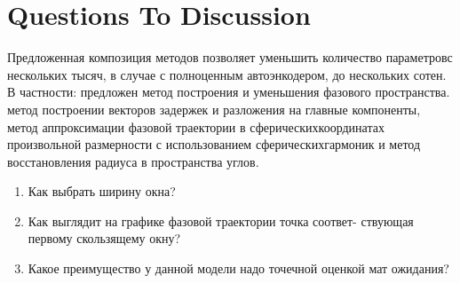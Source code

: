 \section{Questions To Discussion}

Предложенная композиция методов позволяет уменьшить количество параметровс нескольких тысяч, в случае с полноценным автоэнкодером, до нескольких сотен.
В частности: предложен метод построения и уменьшения фазового пространства. метод построении векторов задержек и разложения на главные компоненты, метод аппроксимации фазовой траектории в сферическихкоординатах произвольной размерности с использованием сферическихгармоник и метод восстановления радиуса в пространства углов.
\begin{enumerate}
    \item Как выбрать ширину окна?
    \item Как выглядит на графике фазовой траектории точка соответ-
ствующая первому скользящему окну?
    \item Какое преимущество у данной модели надо точечной оценкой
мат ожидания?
\end{enumerate}